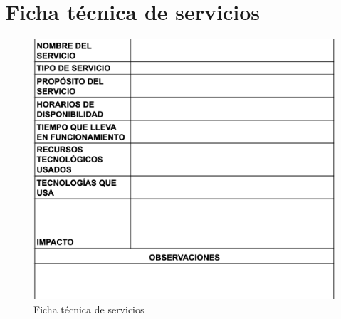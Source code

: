 \chapter{Ficha técnica de servicios}
\label{apendice:ficha-servicios}
\begin{figure}[htbp]
    \centering
    \includegraphics[width=\textwidth,height=0.85\textheight,keepaspectratio]{apendices/caracterizacionServicios.png}
    \caption{Ficha técnica de servicios}
    \label{fig:tabla-ficha-servicios}
\end{figure}